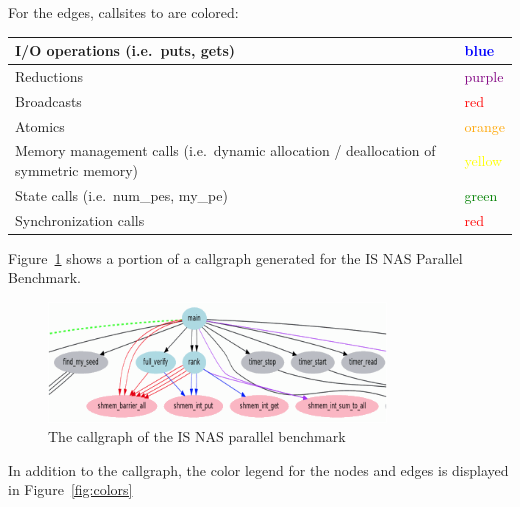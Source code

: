 \vspace{0.1in}

For the edges, callsites to \openshmem are colored:

\vspace{0.1in}

\begin{center}
  \begin{tabular}{| p{10cm} | l |}
    \hline
    I/O operations (i.e.\ puts, gets) & \textcolor{Blue}{blue} \\
    \hline
    Reductions & \textcolor{Purple}{purple} \\
    \hline
    Broadcasts & \textcolor{Red}{red} \\
    \hline
    Atomics & \textcolor{Orange}{orange} \\
    \hline
    Memory management calls (i.e.\ dynamic allocation / deallocation of symmetric memory) & \textcolor{Yellow}{yellow} \\
    \hline
    State calls (i.e.\ num\_pes, my\_pe) & \textcolor{Green}{green} \\
    \hline
    Synchronization calls & \textcolor{Red}{red} \\
    \hline
  \end{tabular}
\end{center}

\vspace{0.1in}

Figure~\ref{fig:is-callgraph} shows a portion of a callgraph generated
for the IS NAS Parallel Benchmark.

\begin{figure}[!ht]
  \begin{center}
    \includegraphics[width=0.8\textwidth]{./image004}
    \caption{The \openshmem callgraph of the IS NAS parallel benchmark}
    \label{fig:is-callgraph}
  \end{center}
\end{figure}

In addition to the callgraph, the color legend for the nodes and edges
is displayed in Figure~\ref{fig:colors}

\vspace{0.1in}

